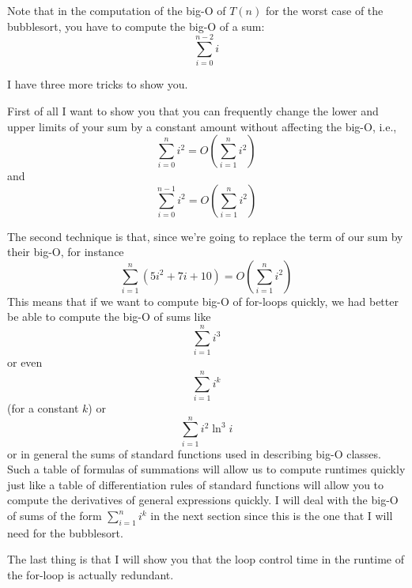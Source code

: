 \newpage



Note that in the computation of the big-O of $T(n)$ for the worst
case of the bubblesort, 
you have to compute the big-O of a sum:
\[
\sum_{i=0}^{n-2} i
\]

I have three more tricks to show you.
 
First of all I want to show you that 
you can frequently change the lower and upper limits 
of your sum by a constant amount without affecting
the big-O, i.e.,
\[
\sum_{i = 0}^n i^2 =
O
\left(
\sum_{i = 1}^n i^2
\right)
\]
and
\[
\sum_{i = 0}^{n-1} i^2 =
O
\left(
\sum_{i = 1}^n i^2
\right)
\]

The second technique is that, since we're going to replace the 
term of our sum by their big-O, 
for instance
\[
\sum_{i=1}^n (5i^2 + 7i + 10)
= 
O
\left(
\sum_{i=1}^n i^2
\right)
\]
This means that if we want to compute big-O of for-loops
quickly, we had better be able to compute the big-O of sums like
\[
\sum_{i = 1}^n i^3
\]
or even
\[
\sum_{i = 1}^n i^k
\]
(for a constant $k$) 
or
\[
\sum_{i = 1}^n i^2 \ln^3 i
\]
or in general the sums of standard functions used in describing
big-O classes.
Such a table of formulas of summations will allow us to compute
runtimes quickly just like a table of
differentiation rules of standard functions will allow you to 
compute the derivatives of general expressions quickly.
I will deal with the big-O of sums of the form $\sum_{i=1}^n i^k$
in the next section since this is the one that I will need for the
bubblesort.

The last thing is that I will show you that the loop control time
in the runtime of the for-loop is actually redundant.

